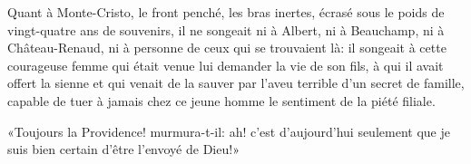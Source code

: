 Quant à Monte-Cristo, le front penché, les bras inertes, écrasé sous le poids de vingt-quatre ans de souvenirs, il ne songeait ni à Albert, ni à Beauchamp, ni à Château-Renaud, ni à personne de ceux qui se trouvaient là: il songeait à cette courageuse femme qui était venue lui demander la vie de son fils, à qui il avait offert la sienne et qui venait de la sauver par l'aveu terrible d'un secret de famille, capable de tuer à jamais chez ce jeune homme le sentiment de la piété filiale. 

«Toujours la Providence! murmura-t-il: ah! c'est d'aujourd'hui seulement que je suis bien certain d'être l'envoyé de Dieu!» 